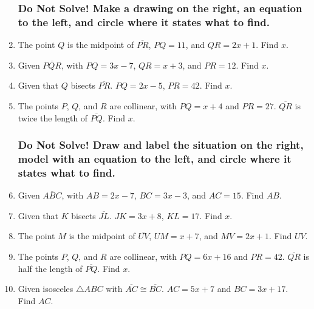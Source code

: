 \begin{enumerate}
\newpage
\subsubsection*{Do Not Solve! Make a drawing on the right, an equation to the left, and circle where it states what to find.}
  \vspace{0.5cm}
\item The point $Q$ is the midpoint of $\overline{PR}$, $PQ=11$, and $QR=2x+1$. Find ${x}$.
\item Given $\overline{PQR}$, with $PQ=3x-7$, $QR=x+3$, and $PR=12$. Find ${x}$.
\item Given that $Q$ bisects $\overline{PR}$. $PQ=2x-5$, $PR=42$. Find ${x}$.
\item The points $P$, $Q$, and $R$ are collinear, with $PQ=x+4$ and $PR=27$. $\overline{QR}$ is twice the length of $\overline{PQ}$. Find ${x}$.

\subsubsection*{Do Not Solve! Draw and label the situation on the right, model with an equation to the left, and circle where it states what to find.}
  \vspace{0.5cm}

\item Given $\overline{ABC}$, with $AB=2x-7$, $BC=3x-3$, and $AC=15$. Find ${AB}$.
\item Given that $K$ bisects $\overline{JL}$. $JK=3x+8$, $KL=17$. Find ${x}$.
\item The point $M$ is the midpoint of $\overline{UV}$, $UM=x+7$, and $MV=2x+1$. Find ${UV}$.
\item The points $P$, $Q$, and $R$ are collinear, with $PQ=6x+16$ and $PR=42$. $\overline{QR}$ is half the length of $\overline{PQ}$. Find ${x}$.

\newpage
\item Given isosceles $\triangle ABC$ with $\overline{AC} \cong \overline{BC}$. $AC=5x+7$ and $BC=3x+17$. \\ Find $AC$.\\[0.5cm]


\end{enumerate}
